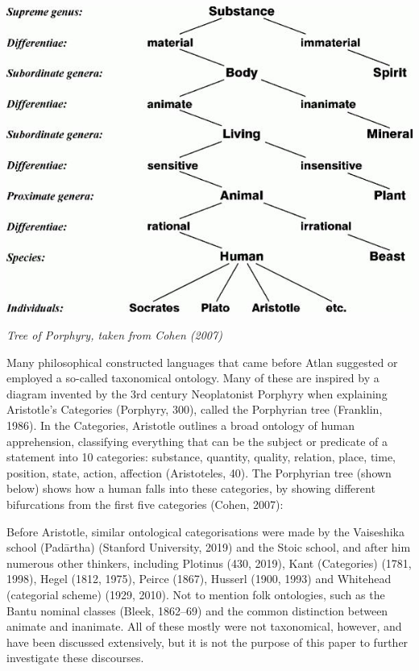 \vspace{0.3cm}

\begin{center}
\includegraphics[scale=0.5]{./Images/tree.jpeg}

{\footnotesize \it Tree of Porphyry, taken from Cohen (2007)}
\end{center}

\noindent Many philosophical constructed languages that came before Atlan suggested or employed a so-called taxonomical ontology. Many of these are inspired by a diagram invented by the 3rd century Neoplatonist Porphyry when explaining Aristotle’s Categories (Porphyry, 300), called the Porphyrian tree (Franklin, 1986). In the Categories, Aristotle outlines a broad ontology of human apprehension, classifying everything that can be the subject or predicate of a statement into 10 categories: substance, quantity, quality, relation, place, time, position, state, action, affection (Aristoteles, 40). The Porphyrian tree (shown below) shows how a human falls into these categories, by showing different bifurcations from the first five categories (Cohen, 2007): 

Before Aristotle, similar ontological categorisations were made by the Vaiseshika school (Padārtha) (Stanford University, 2019) and the Stoic school, and after him numerous other thinkers, including Plotinus (430, 2019), Kant (Categories) (1781, 1998), Hegel  (1812, 1975), Peirce (1867), Husserl (1900, 1993) and Whitehead (categorial scheme) (1929, 2010). Not to mention folk ontologies, such as the Bantu nominal classes (Bleek, 1862–69) and the common distinction between animate and inanimate. All of these mostly were not taxonomical, however, and have been discussed extensively, but it is not the purpose of this paper to further investigate these discourses.  

